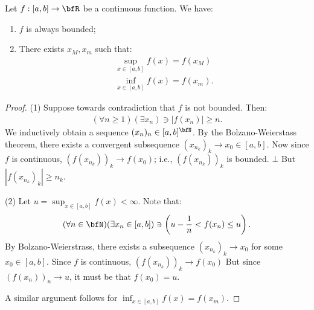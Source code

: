     \begin{theorem}
        Let $f:[a,b] \rightarrow \bfR$ be a continuous function. We have:
            \begin{enumerate}[label = (\arabic*)]
                \item $f$ is always bounded;
                \item There exists $x_M,x_m$ such that:
                    \begin{equation*}
                    \begin{split}
                        \sup_{x \in [a,b]}f(x) = f(x_M) \\
                        \inf_{x \in [a,b]}f(x) = f(x_m).
                    \end{split}
                    \end{equation*}
            \end{enumerate}
    \end{theorem}
        \begin{proof}
            (1) Suppose towards contradiction that $f$ is not bounded. Then:
                \begin{equation*}
                \begin{split}
                    (\forall n \geq 1)(\exists x_n) \ni |f(x_n)| \geq n.
                \end{split}
                \end{equation*}
            We inductively obtain a sequence $(x_n)_n \in [a,b]^\bfN$. By the Bolzano-Weierstass theorem, there exists a convergent subsequence $(x_{n_k})_k \rightarrow x_0 \in [a,b]$. Now since $f$ is continuous, $(f(x_{n_k}))_k \rightarrow f(x_0)$; i.e.,  $(f(x_{n_k}))_k$ is bounded. $\bot$ But $|f(x_{n_k})_k| \geq n_k$. \nl

            (2) Let $u = \sup_{x \in [a,b]}f(x) < \infty$. Note that:
                \begin{equation*}
                \begin{split}
                    (\forall n \in \bfN)(\exists x_n \in [a,b]) \ni \left(u - \frac{1}{n} < f(x_n) \leq u\right).
                \end{split}
                \end{equation*}
            By Bolzano-Weierstrass, there exists a subsequence $(x_{n_k})_k \rightarrow x_0$ for some $x_0 \in [a,b]$. Since $f$ is continuous, $(f(x_{n_k}))_k \rightarrow f(x_0)$ But since $(f(x_n))_n \rightarrow u$, it must be that $f(x_0) = u$. \nl

            A similar argument follows for $\inf_{x \in [a,b]}f(x) = f(x_m)$.
        \end{proof}

